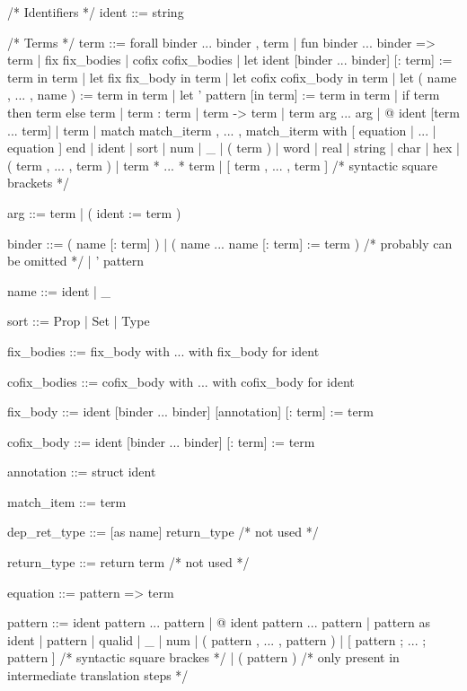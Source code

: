\documentclass[a4paper,11pt]{article}
\begin{document}
\begin{grm}


/* Identifiers */
ident ::= string

/* Terms */
term ::= forall binder ... binder , term
       | fun binder ... binder => term
       | fix fix_bodies
       | cofix cofix_bodies
       | let ident [binder ... binder] [: term] := term in term
       | let fix fix_body in term
       | let cofix cofix_body in term
       | let ( name , ... , name ) := term in term
       | let ' pattern [in term] := term in term
       | if term then term else term
       | term : term
       | term -> term
       | term arg ... arg   
       | @ ident [term ... term]
       | term %
       | match match_iterm , ... , match_iterm with
               [ equation | ... | equation ] end    
       | ident
       | sort
       | num
       | _
       | ( term )
       | word
       | real
       | string
       | char
       | hex
       | ( term , ... , term )
       | term * ... * term
       | [ term , ... , term ] /* syntactic square brackets */
       
       
arg ::= term
      | ( ident := term )

binder ::= ( name [: term] ) 
         | ( name ... name [: term] := term ) /* probably can be omitted */
         | ' pattern

name ::= ident | _

sort ::= Prop | Set | Type

fix_bodies ::= fix_body with ... with fix_body for ident

cofix_bodies ::= cofix_body with ... with cofix_body for ident

fix_body ::= ident [binder ... binder] [annotation] [: term] := term

cofix_body ::= ident [binder ... binder] [: term] := term

annotation ::= { struct ident }

match_item ::= term 

dep_ret_type ::= [as name] return_type /* not used */

return_type ::= return term /* not used */

equation ::= pattern => term

pattern ::= ident pattern ... pattern
          | @ ident pattern ... pattern
          | pattern as ident
          | pattern %
          | qualid
          | _ 
          | num
          | ( pattern , ... , pattern )
          | [ pattern ; ... ; pattern ] /* syntactic square brackes */ 
          | ( pattern ) /* only present in intermediate translation steps */
			

\end{grm}
\end{document}
